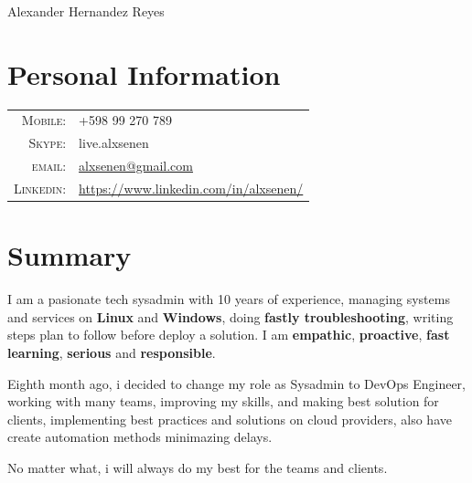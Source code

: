 \documentclass[a4paper,14pt]{article}
\begin{document}
\vspace*{-0.5cm}

\pagestyle{empty} %

{\huge Alexander Hernandez Reyes}
\hfill
{}\\
\section{Personal Information}
\begin{tabular}{rl}
    \textsc{Mobile:}    & +598 99 270 789 \\
    \textsc{Skype:}     & live.alxsenen \\
    \textsc{email:}     & \href{mailto:alxsenen@gmail.com}{alxsenen@gmail.com} \\
    \textsc{Linkedin:}  & \href{https://www.linkedin.com/in/alxsenen/}{https://www.linkedin.com/in/alxsenen/}
\end{tabular}

\section{Summary}
\justify
I am a pasionate tech sysadmin with 10 years of experience, managing systems and services on \textbf{Linux} and \textbf{Windows}, doing \textbf{fastly troubleshooting}, writing steps plan to follow before deploy a solution. I am \textbf{empathic}, \textbf{proactive}, \textbf{fast learning}, \textbf{serious} and \textbf{responsible}.

Eighth month ago, i decided to change my role as Sysadmin to DevOps Engineer, working with many teams, improving my skills, and making best solution for clients, implementing best practices and solutions on cloud providers, also have create automation methods minimazing delays.

No matter what, i will always do my best for the teams and clients.

\end{document}
